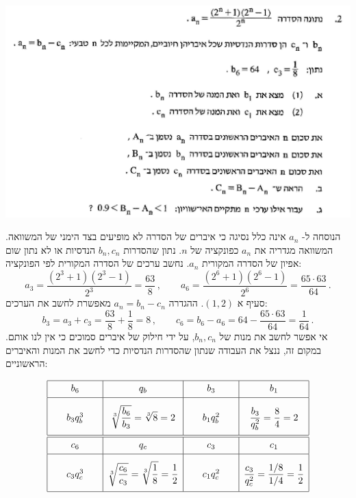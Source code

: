 \documentclass[12pt,a4paper]{article}
\begin{document}
\begin{center}
\includegraphics[width=.95\textwidth]{summer-2017a-2}
\end{center}
הנוסחה ל-%
$a_n$
אינה כלל נסיגה כי איברים של הסדרה לא מופיעים בצד הימני של המשוואה. המשוואה מגדריה את
$a_n$
כפונקציה של
$n$.
נתון שהסדרות 
$b_n,c_n$
הנדסיות או לא נתון שום אפיון של הסדרה המקורית
$a_n$.
נחשב ערכים של הסדרה המקורית לפי הפונקציה:
\[
a_3=\frac{(2^3+1)(2^3-1)}{2^3}=\frac{63}{8}\,, \quad\quad a_6=\frac{(2^6+1)(2^6-1)}{2^6}= \frac{65\cdot 63}{64}\,.
\]
סעיף א 
$(1,2)$.
ההגדרה
$a_n=b_n-c_n$
מאפשרת לחשב את הערכים:
\[
b_3=a_3+c_3=\frac{63}{8}+\frac{1}{8}=8\,,\quad\quad c_6=b_6-a_6=64-\frac{65\cdot 63}{64}=\frac{1}{64}\,.
\]
אי אפשר לחשב את מנות של
$b_n,c_n$,
על ידי חילוק של איברים סמוכים כי אין לנו אותם. במקום זה, ננצל את העבודה שנתון שהסדרות הנדסיות כדי לחשב את המנות והאיברים הראשוניים:

\[
\begin{array}{|@{\hspace{2em}}c@{\hspace{2em}}|c|@{\hspace{2em}}c@{\hspace{2em}}|c|}
\hline
\rule[-1.5ex]{0pt}{4ex}b_6&q_b&b_3&b_1\\\hline
\rule[-3.5ex]{0pt}{9ex}b_3q_b^3 & \displaystyle\sqrt[3]{\frac{b_6}{b_3}}=\sqrt[3]{8}=2&
b_1 q_b^2 & \displaystyle\frac{b_3}{q_b^2}=\frac{8}{4}=2\\\hline\hline
\rule[-1.5ex]{0pt}{4ex}c_6&q_c&c_3&c_1\\\hline
c_3q_c^3 & \displaystyle\sqrt[3]{\frac{c_6}{c_3}} =\sqrt[3]{\frac{1}{8}} = \frac{1}{2}&
\rule[-3.5ex]{0pt}{9ex}c_1 q_c^2 & \displaystyle\frac{c_3}{q_c^2}=\frac{1/8}{1/4}=\frac{1}{2}\\
\hline
\end{array}
\]
\end{document}
